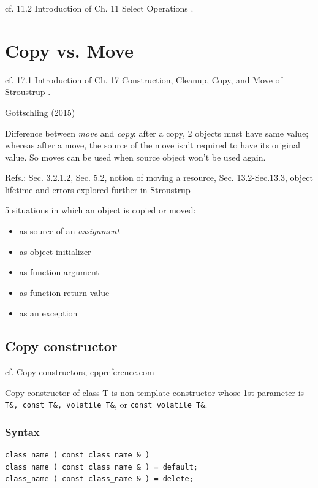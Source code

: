 \documentclass[10pt]{amsart}
\begin{document}
cf. 11.2 Introduction of Ch. 11 Select Operations \cite{Stro2013}.  




\section{Copy vs. Move}  
cf. 17.1 Introduction of Ch. 17 Construction, Cleanup, Copy, and Move of Stroustrup \cite{Stro2013}.  

Gottschling (2015) \cite{Gott2015}

Difference between \emph{move} and \emph{copy}: after a copy, 2 objects must have same value; whereas after a move, the source of the move isn't required to have its original value.  So moves can be used when source object won't be used again.  

Refs.: Sec. 3.2.1.2, Sec. 5.2, notion of moving a resource, Sec. 13.2-Sec.13.3, object lifetime and errors explored further in Stroustrup \cite{Stro2013}  


5 situations in which an object is copied or moved:   
\begin{itemize}
	\item as source of an \emph{assignment}
	\item as object initializer 
	\item as function argument
	\item as function return value
	\item as an exception  
\end{itemize}

\subsection{Copy constructor}

cf. \href{http://en.cppreference.com/w/cpp/language/copy_constructor}{Copy constructors, cppreference.com}

Copy constructor of class T is non-template constructor whose 1st parameter is \verb|T&, const T&, volatile T&|, or \verb|const volatile T&|.  

\subsubsection{Syntax}  

\begin{lstlisting}
class_name ( const class_name & )  
class_name ( const class_name & ) = default;  
class_name ( const class_name & ) = delete;
\end{lstlisting}  
\end{document}
